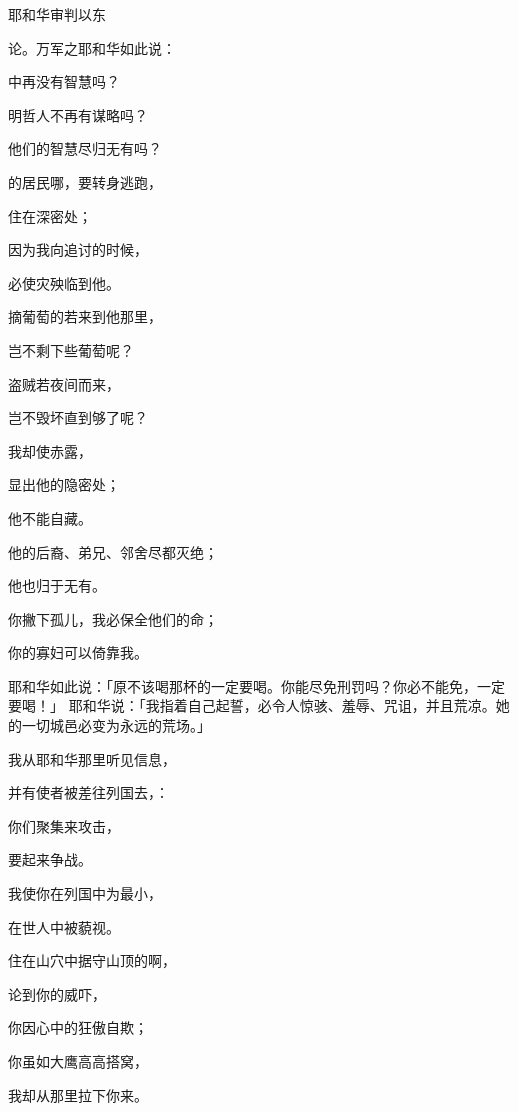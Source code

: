 {\par }{\SH 耶和华审判以东
\par }{\PP {}论{}。万军之耶和华如此说：
\par }{\BB \par }{中再没有智慧吗？
\par }{\Q 明哲人不再有谋略吗？
\par }{\Q 他们的智慧尽归无有吗？
\par }{\Q {}的居民哪，要转身逃跑，
\par }{\Q 住在深密处；
\par }{\Q 因为我向{}追讨的时候，
\par }{\Q 必使灾殃临到他。
\par }{\Q {}摘葡萄的若来到他那里，
\par }{\Q 岂不剩下些葡萄呢？
\par }{\Q 盗贼若夜间而来，
\par }{\Q 岂不毁坏直到够了呢？
\par }{\Q {}我却使{}赤露，
\par }{\Q 显出他的隐密处；
\par }{\Q 他不能自藏。
\par }{\Q 他的后裔、弟兄、邻舍尽都灭绝；
\par }{\Q 他也归于无有。
\par }{\Q {}你撇下孤儿，我必保全他们的命；
\par }{\Q 你的寡妇可以倚靠我。
\par }{\PP {}耶和华如此说：「原不该喝那杯的一定要喝。你能尽免刑罚吗？你必不能免，一定要喝！」
耶和华说：「我指着自己起誓，{}必令人惊骇、羞辱、咒诅，并且荒凉。她的一切城邑必变为永远的荒场。」
\par }{\Q {}我从耶和华那里听见信息，
\par }{\Q 并有使者被差往列国去，{}：
\par }{\Q 你们聚集来攻击{}，
\par }{\Q 要起来争战。
\par }{\Q {}我使你在列国中为最小，
\par }{\Q 在世人中被藐视。
\par }{\Q {}住在山穴中据守山顶的啊，
\par }{\Q 论到你的威吓，
\par }{\Q 你因心中的狂傲自欺；
\par }{\Q 你虽如大鹰高高搭窝，
\par }{\Q 我却从那里拉下你来。
}
